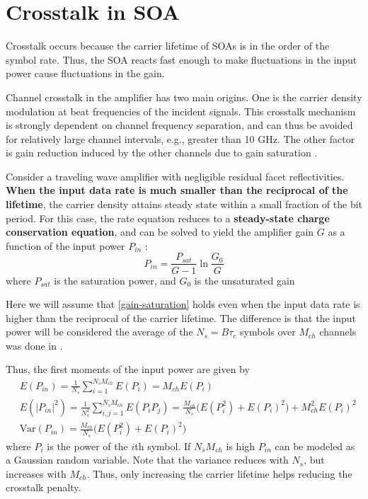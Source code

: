 \documentclass[a4paper]{article}
\begin{document}
\section{Crosstalk in SOA}

Crosstalk occurs because the carrier lifetime of SOAs is in the order of the symbol rate. Thus, the SOA reacts fast enough to make fluctuations in the input power cause fluctuations in the gain.

Channel crosstalk in the amplifier has two main origins. One is the carrier density modulation at beat frequencies of the incident signals. This crosstalk mechanism is strongly dependent on channel frequency separation, and can thus be avoided for relatively large channel intervals, e.g., greater than 10 GHz. The other factor is gain reduction induced by the other channels due to gain saturation \cite{soa-crosstalk-and-penalty}.

Consider a traveling wave amplifier with negligible residual facet reflectivities. \textbf{When the input data rate is much smaller than the reciprocal of the lifetime}, the carrier density attains steady state within a small fraction of the bit period. For this case, the rate equation reduces to a \textbf{steady-state charge conservation equation}, and can be solved to yield the amplifier gain $G$ as a function of the input power $P_{in}$ \cite{soa-crosstalk}:
\begin{equation} \label{gain-saturation}
P_{in} = \frac{P_{sat}}{G-1}\ln\frac{G_0}{G}
\end{equation}
where $P_{sat}$ is the saturation power, and $G_0$ is the unsaturated gain

Here we will assume that \eqref{gain-saturation} holds even when the input data rate is higher than the reciprocal of the carrier lifetime. The difference is that the input power will be considered the average of the $N_s = B\tau_c$ symbols over $M_{ch}$ channels was done in \cite{soa-crosstalk-inc-lifetime}.

Thus, the first moments of the input power are given by
\begin{align}
& E(P_{in}) = \frac{1}{N_s}\sum_{i = 1}^{N_sM_{ch}} E(P_i) = M_{ch}E(P_i) \\
& E(|P_{in}|^2) = \frac{1}{N^2_s}\sum_{i, j = 1}^{N_sM_{ch}} E(P_iP_j) = \frac{M_{ch}}{N_s}\Big(E(P_i^2) + E(P_i)^2\Big) + M_{ch}^2E(P_i)^2 \\
& \text{Var}(P_{in}) = \frac{M_{ch}}{N_s}\Big(E(P_i^2) + E(P_i)^2\Big)
\end{align}
where $P_i$ is the power of the $i$th symbol. If $N_sM_{ch}$ is high $P_{in}$ can be modeled as a Gaussian random variable. Note that the variance reduces with $N_s$, but increases with $M_{ch}$. Thus, only increasing the carrier lifetime helps reducing the crosstalk penalty.
\end{document}
